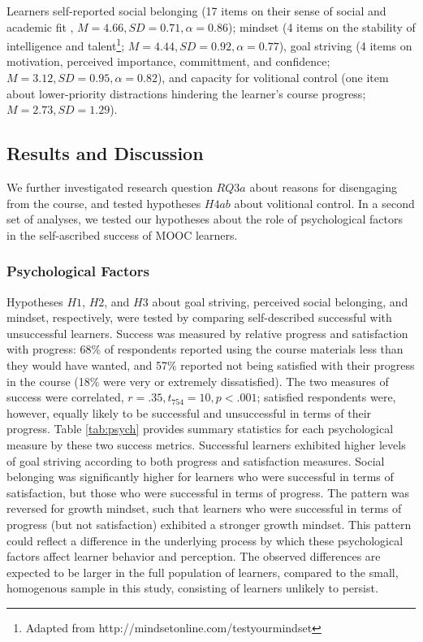 \documentclass{sigchi}\usepackage[]{graphicx}\usepackage[]{color}
\begin{document}
Learners self-reported social belonging (17 items on their sense of social and academic fit \cite{walton2007question}, $M=4.66, SD=0.71, \alpha=0.86$); mindset (4 items on the stability of intelligence and talent\footnote{Adapted from http://mindsetonline.com/testyourmindset}; $M=4.44, SD=0.92, \alpha=0.77$), goal striving (4 items on motivation, perceived importance, committment, and confidence; $M=3.12, SD=0.95, \alpha=0.82$), and capacity for volitional control (one item about lower-priority distractions hindering the learner's course progress; $M=2.73, SD=1.29$).

\subsection{Results and Discussion}

We further investigated research question $RQ3a$ about reasons for disengaging from the course, and tested hypotheses $H4ab$ about volitional control. In a second set of analyses, we tested our hypotheses about the role of psychological factors in the self-ascribed success of MOOC learners.

\subsubsection{Psychological Factors}

Hypotheses $H1$, $H2$, and $H3$ about goal striving, perceived social belonging, and mindset, respectively, were tested by comparing self-described successful with unsuccessful learners. Success was measured by relative progress and satisfaction with progress: 68\% of respondents reported using the course materials less than they would have wanted, and 57\% reported not being satisfied with their progress in the course (18\% were very or extremely dissatisfied). The two measures of success were correlated, $r=.35, t_{754}=10, p<.001$; satisfied respondents were, however, equally likely to be successful and unsuccessful in terms of their progress. Table \ref{tab:psych} provides summary statistics for each psychological measure by these two success metrics. Successful learners exhibited higher levels of goal striving according to both progress and satisfaction measures. Social belonging was significantly higher for learners who were successful in terms of satisfaction, but those who were successful in terms of progress. The pattern was reversed for growth mindset, such that learners who were successful in terms of progress (but not satisfaction) exhibited a stronger growth mindset. This pattern could reflect a difference in the underlying process by which these psychological factors affect learner behavior and perception. The observed differences are expected to be larger in the full population of learners, compared to the small, homogenous sample in this study, consisting of learners unlikely to persist.  
\end{document}
